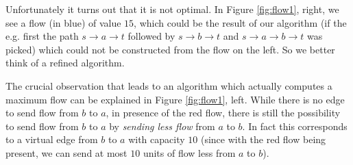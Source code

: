 \documentclass{article}
\begin{document}
Unfortunately it turns out that it is not optimal. In Figure \ref{fig:flow1}, right, we see a flow (in blue) of value $15$, which could be the result of our algorithm (if the e.g. first the path $s\rightarrow a\rightarrow t$ followed by $s\rightarrow b \rightarrow t$ and $s\rightarrow a \rightarrow b \rightarrow t$ was picked) which could not be constructed from the flow on the left. So we better think of a refined algorithm.

The crucial observation that leads to an algorithm which actually computes a maximum flow can  be explained in Figure \ref{fig:flow1}, left. While there is no edge to send flow from $b$ to $a$, in presence of the red flow, there is still the possibility to send flow from $b$ to $a$ by \emph{sending less flow} from $a$ to $b$. In fact this corresponds to a virtual edge from $b$ to $a$ with capacity $10$ (since with the red flow being present, we can send at most $10$ units of flow less from $a$ to $b$).
\end{document}
